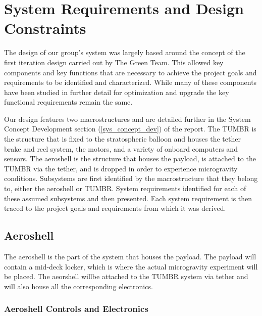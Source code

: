 
\section{\label{sys_reqs}System Requirements and Design Constraints}

\indent\indent The design of our group's system was largely based around the concept of the first iteration design carried out by The Green Team. This allowed key components and key functions that are necessary to achieve the project goals and requirements to be identified and characterized. While many of these components have been studied in further detail for optimization and upgrade the key functional requirements remain the same.

\indent\indent Our design features two macrostructures and are detailed further in the System Concept Development section (\ref{sys_concept_dev}) of the report. The TUMBR is the structure that is fixed to the stratospheric balloon and houses the tether brake and reel system, the motors, and a variety of onboard computers and sensors. The aeroshell is the structure that houses the payload, is attached to the TUMBR via the tether, and is dropped in order to experience microgravity conditions. Subsystems are first identified by the macrostructure that they belong to, either the aeroshell or TUMBR. System requirements identified for each of these assumed subsystems and then presented. Each system requirement is then traced to the project goals and requirements from which it was derived.

\subsection{Aeroshell}

\indent\indent The aeroshell is the part of the system that houses the payload. The payload will contain a mid-deck locker, which is where the actual microgravity experiment will be placed. The aeorshell willbe attached to the TUMBR system via tether and will also house all the corresponding electronics.

\subsubsection{Aeroshell Controls and Electronics}

